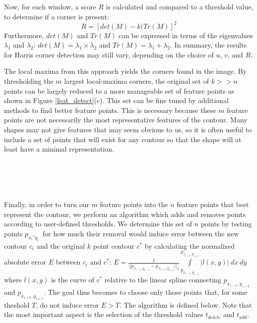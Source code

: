 \documentclass[paper=a4, fontsize=11pt]{scrartcl} %
\begin{document}
Now, for each window, a score $R$ is calculated and compared to a threshold value, to determine if a corner is present:
$$
R = [det(M) - k(Tr(M)]^2
$$
Furthermore, $det(M)$ and $Tr(M)$ can be expressed in terms of the eigenvalues $\lambda_1$ and $\lambda_2$: $det(M) = \lambda_1 \times \lambda_2$ and $Tr(M) = \lambda_1 + \lambda_2$. In summary, the results for Harris corner detection may still vary, depending on the choice of $u$, $v$, and $R$.

The local maxima from this approach yields the corners found in the image. By thresholding the $m$ largest local-maxima corners, the original set of $k >> n$ points can be largely reduced to a more manageable set of feature points as shown in Figure \ref{feat_detect}(c). This set can be fine tuned by additional methods to find better feature points. This is necessary because these $m$ feature points are not necessarily the most representative features of the contour. Many shapes may not give features that may seem obvious to us, so it is often useful to include a set of points that will exist for any contour so that the shape will at least have a minimal representation.  


\\
\\
\\
\\
Finally, in order to turn our $m$ feature points into the $n$ feature points that best represent the contour, we perform an algorithm which adds and removes points according to user-defined thresholds. We determine this set of $n$ points by testing points $p_{x_i},_{y_i}$ for how much their removal would induce error between the new contour $c_i$ and the original $k$ point contour $c^*$ by calculating the normalized absolute error $E$ between $c_i$ and $c^*$: $E = \frac{1}{|| p_{x_{i-1},y_{i-1}}  -  p_{x_{i+1},y_{i+1}} ||_2} \int\limits_{p_{x_{i-1},y_{i-1}}}^{p_{x_{i+1},y_{i+1}}} |l(x,y)| \ dx \ dy$ where $l(x,y)$ is the curve of $c^*$ relative to the linear spline connecting $p_{x_{i-1},y_{i-1}}$ and $p_{x_{i+1},y_{i+1}}$. The goal thus becomes to choose only those points that, for some theshold $T$, do not induce error $E > T$. The algorithm is defined below. Note that the most important aspect is the selection of the threshold values $t_{delete}$ and $t_{add}$. 
\end{document}
